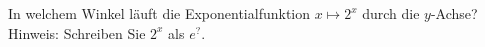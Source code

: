 \item 
In welchem Winkel läuft die Exponentialfunktion $x \mapsto 2^x$ durch die $y$-Achse?\\
Hinweis: Schreiben Sie $2^x$ als $e^?$.

